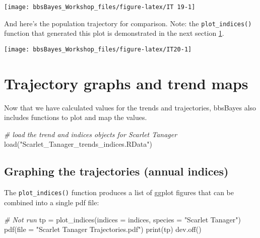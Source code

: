 \documentclass[
]{book}
\newenvironment{Shaded}{\begin{snugshade}}{\end{snugshade}}
\newcommand{\AttributeTok}[1]{\textcolor[rgb]{0.77,0.63,0.00}{#1}}
\newcommand{\CommentTok}[1]{\textcolor[rgb]{0.56,0.35,0.01}{\textit{#1}}}
\newcommand{\FunctionTok}[1]{\textcolor[rgb]{0.00,0.00,0.00}{#1}}
\newcommand{\NormalTok}[1]{#1}
\newcommand{\OtherTok}[1]{\textcolor[rgb]{0.56,0.35,0.01}{#1}}
\newcommand{\StringTok}[1]{\textcolor[rgb]{0.31,0.60,0.02}{#1}}
\begin{document}
\begin{center}\texttt{[image: bbsBayes\_Workshop\_files/figure-latex/IT 19-1]} \end{center}

And here's the population trajectory for comparison. Note: the \texttt{plot\_indices()} function that generated this plot is demonstrated in the next section \ref{GraphMap}.

\begin{center}\texttt{[image: bbsBayes\_Workshop\_files/figure-latex/IT20-1]} \end{center}

\hypertarget{GraphMap}{%
\chapter{Trajectory graphs and trend maps}\label{GraphMap}}

Now that we have calculated values for the trends and trajectories, bbsBayes also includes functions to plot and map the values.

\begin{Shaded}
\begin{Highlighting}[]
\CommentTok{\# load the trend and indices objects for Scarlet Tanager}
\FunctionTok{load}\NormalTok{(}\StringTok{"Scarlet\_Tanager\_trends\_indices.RData"}\NormalTok{)}
\end{Highlighting}
\end{Shaded}

\hypertarget{graphing-the-trajectories-annual-indices}{%
\section{Graphing the trajectories (annual indices)}\label{graphing-the-trajectories-annual-indices}}

The \texttt{plot\_indices()} function produces a list of ggplot figures that can be combined into a single pdf file:

\begin{Shaded}
\begin{Highlighting}[]
\CommentTok{\# Not run}
\NormalTok{tp }\OtherTok{=} \FunctionTok{plot\_indices}\NormalTok{(}\AttributeTok{indices =}\NormalTok{ indices,}
                         \AttributeTok{species =} \StringTok{"Scarlet Tanager"}\NormalTok{)}
\FunctionTok{pdf}\NormalTok{(}\AttributeTok{file =} \StringTok{"Scarlet Tanager Trajectories.pdf"}\NormalTok{)}
\FunctionTok{print}\NormalTok{(tp)}
\FunctionTok{dev.off}\NormalTok{()}
\end{Highlighting}
\end{Shaded}
\end{document}

